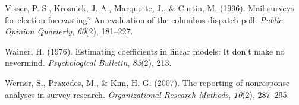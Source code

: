 \documentclass[
  ,man,floatsintext]{apa6}
\newlength{\cslhangindent}
\newlength{\cslentryspacingunit} %
\newenvironment{CSLReferences}[2] %
 {%
  \setlength{\parindent}{0pt}
  \ifodd #1
  \let\oldpar\par
  \def\par{\hangindent=\cslhangindent\oldpar}
  \fi
  \setlength{\parskip}{#2\cslentryspacingunit}
 }%
 {}
\begin{document}
\begin{CSLReferences}{1}{0}
\leavevmode{}%
Visser, P. S., Krosnick, J. A., Marquette, J., \& Curtin, M. (1996). Mail surveys for election forecasting? An evaluation of the columbus dispatch poll. \emph{Public Opinion Quarterly}, \emph{60}(2), 181--227.

\leavevmode{}%
Wainer, H. (1976). Estimating coefficients in linear models: It don't make no nevermind. \emph{Psychological Bulletin}, \emph{83}(2), 213.

\leavevmode{}%
Werner, S., Praxedes, M., \& Kim, H.-G. (2007). The reporting of nonresponse analyses in survey research. \emph{Organizational Research Methods}, \emph{10}(2), 287--295.

\end{CSLReferences}

\endgroup
\end{document}
